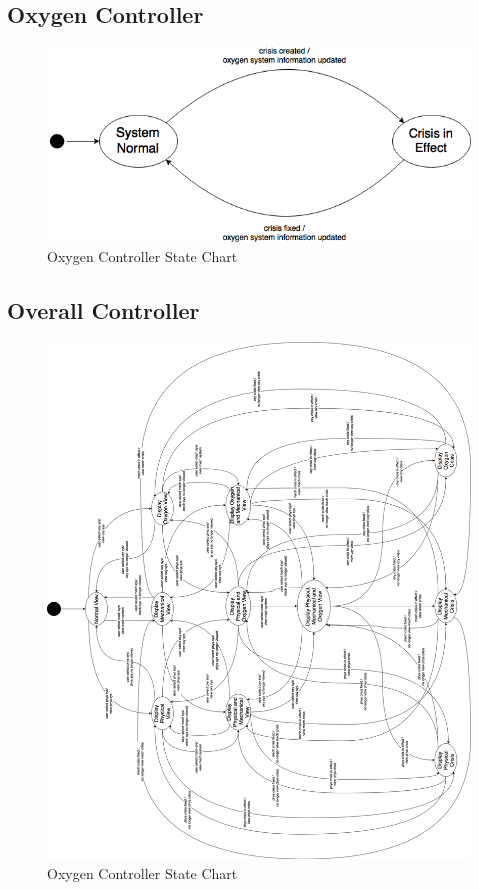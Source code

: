 \documentclass[12pt, titlepage]{article}
\begin{document}
\subsection*{Oxygen Controller}\begin{figure}[H]
\centering
\includegraphics[width=120mm]{OxygenController.png}
\caption{Oxygen Controller State Chart}
\end{figure}

\subsection*{Overall Controller}
\newpage
\begin{figure}[H]

\centering
\includegraphics[width=180mm]{OC.png}
\caption{Oxygen Controller State Chart}
\end{figure}
\end{document}
